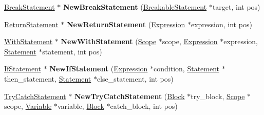 \begin{DoxyCompactItemize}
\item 
\hyperlink{classv8_1_1internal_1_1_break_statement}{Break\+Statement} $\ast$ {\bfseries New\+Break\+Statement} (\hyperlink{classv8_1_1internal_1_1_breakable_statement}{Breakable\+Statement} $\ast$target, int pos)\hypertarget{classv8_1_1internal_1_1_b_a_s_e___e_m_b_e_d_d_e_d_a7194c80e4cef9cc169c1b200c88ba36e}{}\label{classv8_1_1internal_1_1_b_a_s_e___e_m_b_e_d_d_e_d_a7194c80e4cef9cc169c1b200c88ba36e}

\item 
\hyperlink{classv8_1_1internal_1_1_return_statement}{Return\+Statement} $\ast$ {\bfseries New\+Return\+Statement} (\hyperlink{classv8_1_1internal_1_1_expression}{Expression} $\ast$expression, int pos)\hypertarget{classv8_1_1internal_1_1_b_a_s_e___e_m_b_e_d_d_e_d_a927c213a101a1ab70bf2381ffe5a12ef}{}\label{classv8_1_1internal_1_1_b_a_s_e___e_m_b_e_d_d_e_d_a927c213a101a1ab70bf2381ffe5a12ef}

\item 
\hyperlink{classv8_1_1internal_1_1_with_statement}{With\+Statement} $\ast$ {\bfseries New\+With\+Statement} (\hyperlink{classv8_1_1internal_1_1_scope}{Scope} $\ast$scope, \hyperlink{classv8_1_1internal_1_1_expression}{Expression} $\ast$expression, \hyperlink{classv8_1_1internal_1_1_statement}{Statement} $\ast$statement, int pos)\hypertarget{classv8_1_1internal_1_1_b_a_s_e___e_m_b_e_d_d_e_d_a0d524437773869f27d3b57531de5a874}{}\label{classv8_1_1internal_1_1_b_a_s_e___e_m_b_e_d_d_e_d_a0d524437773869f27d3b57531de5a874}

\item 
\hyperlink{classv8_1_1internal_1_1_if_statement}{If\+Statement} $\ast$ {\bfseries New\+If\+Statement} (\hyperlink{classv8_1_1internal_1_1_expression}{Expression} $\ast$condition, \hyperlink{classv8_1_1internal_1_1_statement}{Statement} $\ast$then\+\_\+statement, \hyperlink{classv8_1_1internal_1_1_statement}{Statement} $\ast$else\+\_\+statement, int pos)\hypertarget{classv8_1_1internal_1_1_b_a_s_e___e_m_b_e_d_d_e_d_a144d691f47e74191d9197e2ed72acb59}{}\label{classv8_1_1internal_1_1_b_a_s_e___e_m_b_e_d_d_e_d_a144d691f47e74191d9197e2ed72acb59}

\item 
\hyperlink{classv8_1_1internal_1_1_try_catch_statement}{Try\+Catch\+Statement} $\ast$ {\bfseries New\+Try\+Catch\+Statement} (\hyperlink{classv8_1_1internal_1_1_block}{Block} $\ast$try\+\_\+block, \hyperlink{classv8_1_1internal_1_1_scope}{Scope} $\ast$scope, \hyperlink{classv8_1_1internal_1_1_variable}{Variable} $\ast$variable, \hyperlink{classv8_1_1internal_1_1_block}{Block} $\ast$catch\+\_\+block, int pos)\hypertarget{classv8_1_1internal_1_1_b_a_s_e___e_m_b_e_d_d_e_d_a68e37a6e0b94409684692b7488055890}{}\label{classv8_1_1internal_1_1_b_a_s_e___e_m_b_e_d_d_e_d_a68e37a6e0b94409684692b7488055890}


\end{DoxyCompactItemize}
